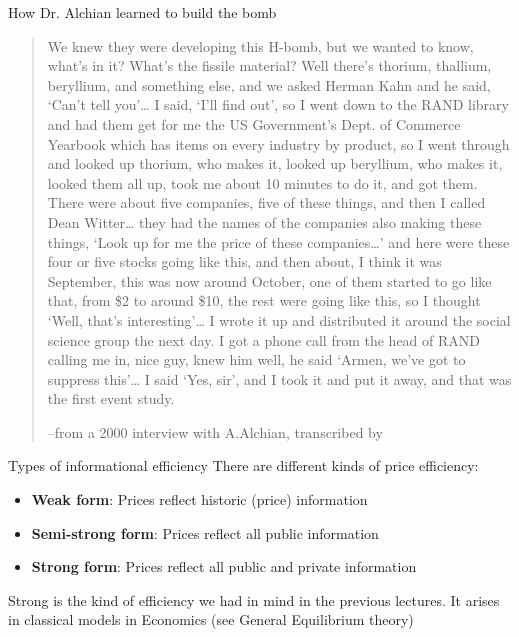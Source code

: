 \documentclass[english,10pt
,aspectratio=169
]{beamer}
\begin{document}
\begin{frame}{How Dr. Alchian learned to build the bomb}
	\small 
	\begin{quote}
		We knew they were developing this H-bomb, but we wanted to know, what's in it? What's the fissile material? Well there's thorium, thallium, beryllium, and something else, and we asked Herman Kahn and he said, ‘Can't tell you’… I said, ‘I'll find out’, so I went down to the RAND library and had them get for me the US Government's Dept. of Commerce Yearbook which has items on every industry by product, so I went through and looked up thorium, who makes it, looked up beryllium, who makes it, looked them all up, took me about 10 minutes to do it, and got them. There were about five companies, five of these things, and then I called Dean Witter… they had the names of the companies also making these things, ‘Look up for me the price of these companies…’ and here were these four or five stocks going like this, and then about, I think it was September, this was now around October, one of them started to go like that, from \$2 to around \$10, the rest were going like this, so I thought ‘Well, that's interesting’… I wrote it up and distributed it around the social science group the next day. I got a phone call from the head of RAND calling me in, nice guy, knew him well, he said ‘Armen, we've got to suppress this’… I said ‘Yes, sir’, and I took it and put it away, and that was the first event study.
		\begin{flushright}
			--from a 2000 interview with A.Alchian, transcribed by \cite{newhard_stock_2014}
		\end{flushright}
	\end{quote}
\end{frame}


%	


\begin{frame}{Types of informational efficiency}
	There are different kinds of price efficiency:
	\begin{itemize}
		\item \textbf{Weak form}: Prices reflect historic (price) information
		\item \textbf{Semi-strong form}: Prices reflect all public information
		\item \textbf{Strong form}: Prices reflect all public and private information
	\end{itemize}
	Strong is the kind of efficiency we had in mind in the previous lectures. It arises in classical models in Economics (see General Equilibrium theory)
\end{frame}
\end{document}
